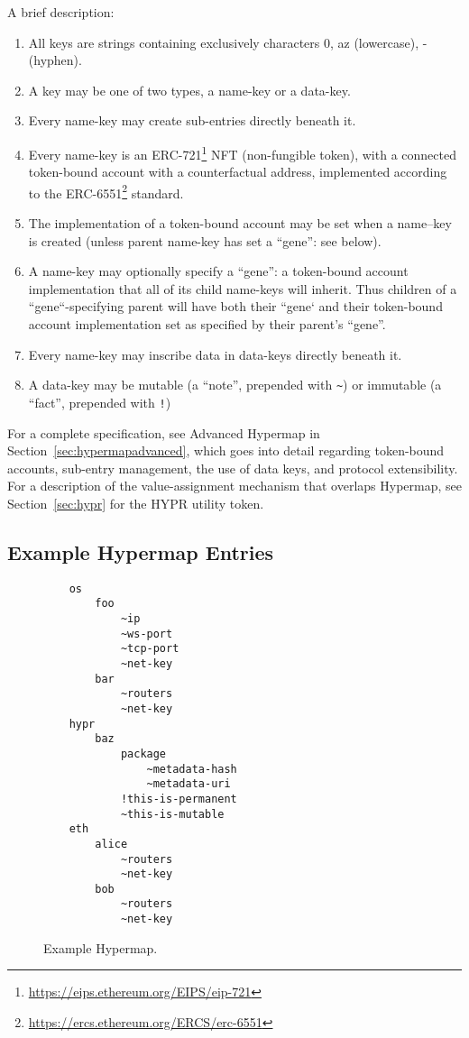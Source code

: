 \documentclass[runningheads]{llncs}
\begin{document}
A brief description:

\begin{enumerate}
    \item All keys are strings containing exclusively characters 0, a\textendash z (lowercase),    - (hyphen).
    \item A key may be one of two types, a name-key or a data-key.
    \item Every name-key may create sub-entries directly beneath it.
    \item Every name-key is an ERC-721\footnote{\url{https://eips.ethereum.org/EIPS/eip-721}} NFT (non-fungible token), with a connected token-bound account with a counterfactual address, implemented according to the ERC-6551\footnote{\url{https://ercs.ethereum.org/ERCS/erc-6551}} standard.
    \item The implementation of a token-bound account may be set when a name–key is created (unless parent name-key has set a ``gene'': see below).
    \item A name-key may optionally specify a ``gene'': a token-bound account implementation that all of its child name-keys will inherit.
    		  Thus children of a ``gene``-specifying parent will have both their ``gene` and their token-bound account implementation set as specified by their parent's ``gene''.
    \item Every name-key may inscribe data in data-keys directly beneath it.
    \item A data-key may be mutable (a ``note'', prepended with \verb|~|) or immutable (a ``fact'', prepended with \verb|!|)
\end{enumerate}

For a complete specification, see Advanced Hypermap in Section~\ref{sec:hypermapadvanced}, which goes into detail regarding token-bound accounts, sub-entry management, the use of data keys, and protocol extensibility.
For a description of the value-assignment mechanism that overlaps Hypermap, see Section~\ref{sec:hypr} for the HYPR utility token.

\subsection{Example Hypermap Entries}

\begin{figure}[H]
    \centering
    \begin{verbatim}
    os
        foo
            ~ip
            ~ws-port
            ~tcp-port
            ~net-key
        bar
            ~routers
            ~net-key
    hypr
        baz
            package
                ~metadata-hash
                ~metadata-uri
            !this-is-permanent
            ~this-is-mutable
    eth
        alice
            ~routers
            ~net-key
        bob
            ~routers
            ~net-key
    \end{verbatim}
    \caption{Example Hypermap.}
    \label{fig:example hypermap}
\end{figure}
\end{document}

